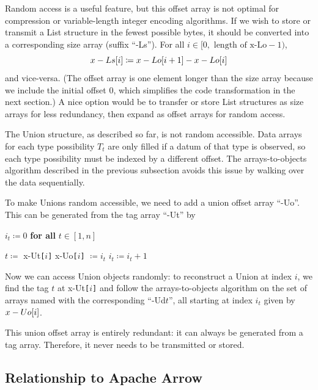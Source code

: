 \documentclass[10pt, conference, compsocconf]{IEEEtran}
\begin{document}
Random access is a useful feature, but this offset array is not optimal for compression or variable-length integer encoding algorithms. If we wish to store or transmit a List structure in the fewest possible bytes, it should be converted into a corresponding size array (suffix ``-Ls''). For all $i \in [0, \mbox{ length of x-Lo} - 1)$,
\[ \mbox{x-Ls{\tt [}} i \mbox{\tt ]} \coloneqq \mbox{x-Lo{\tt [}} i + 1 \mbox{\tt ]} - \mbox{x-Lo{\tt [}} i \mbox{\tt ]} \]
and vice-versa. (The offset array is one element longer than the size array because we include the initial offset 0, which simplifies the code transformation in the next section.) A nice option would be to transfer or store List structures as size arrays for less redundancy, then expand as offset arrays for random access.

The Union structure, as described so far, is not random accessible. Data arrays for each type possibility $T_t$ are only filled if a datum of that type is observed, so each type possibility must be indexed by a different offset. The arrays-to-objects algorithm described in the previous subsection avoids this issue by walking over the data sequentially.

To make Unions random accessible, we need to add a union offset array ``-Uo''. This can be generated from the tag array ``-Ut'' by
\begin{algorithmic}
\vspace{0.15 cm}
\STATE $i_t \coloneqq 0$ {\bf for all} $t \in [1, n]$

\vspace{0.15 cm}
\STATE $t \coloneqq$ \mbox{x-Ut}{\tt [}$i${\tt ]}
\STATE \mbox{x-Uo}{\tt [}$i${\tt ]} $\coloneqq i_t$
\STATE $i_t \coloneqq i_t + 1$
\ENDFOR
\end{algorithmic}

Now we can access Union objects randomly: to reconstruct a Union at index $i$, we find the tag $t$ at x-Ut{\tt [}$i${\tt ]} and follow the arrays-to-objects algorithm on the set of arrays named with the corresponding ``-Ud$t$'', all starting at index $i_t$ given by $\mbox{x-Uo{\tt [}}i\mbox{\tt]}$.

This union offset array is entirely redundant: it can always be generated from a tag array. Therefore, it never needs to be transmitted or stored.

\subsection{Relationship to Apache Arrow}
\end{document}
